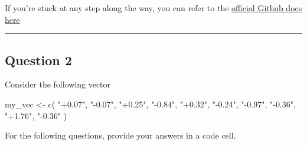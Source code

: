 \documentclass[
  letterpaper,
  DIV=11,
  numbers=noendperiod]{scrartcl}
\newenvironment{Shaded}{\begin{snugshade}}{\end{snugshade}}
\newcommand{\FunctionTok}[1]{\textcolor[rgb]{0.28,0.35,0.67}{#1}}
\newcommand{\NormalTok}[1]{\textcolor[rgb]{0.00,0.23,0.31}{#1}}
\newcommand{\OtherTok}[1]{\textcolor[rgb]{0.00,0.23,0.31}{#1}}
\newcommand{\StringTok}[1]{\textcolor[rgb]{0.13,0.47,0.30}{#1}}
\begin{document}
If you're stuck at any step along the way, you can refer to the
\href{https://docs.github.com/en/pull-requests/collaborating-with-pull-requests/proposing-changes-to-your-work-with-pull-requests/creating-a-pull-request-from-a-fork}{official
Github docs here}

\begin{center}\rule{0.5\linewidth}{0.5pt}\end{center}

\hypertarget{question-2}{%
\subsection{Question 2}\label{question-2}}

\begin{tcolorbox}[enhanced jigsaw, leftrule=.75mm, breakable, colframe=quarto-callout-tip-color-frame, coltitle=black, colback=white, opacitybacktitle=0.6, colbacktitle=quarto-callout-tip-color!10!white, left=2mm, titlerule=0mm, bottomtitle=1mm, bottomrule=.15mm, title=\textcolor{quarto-callout-tip-color}{\faLightbulb}\hspace{0.5em}{30 points}, arc=.35mm, rightrule=.15mm, toptitle=1mm, toprule=.15mm, opacityback=0]

\end{tcolorbox}

Consider the following vector

\begin{Shaded}
\begin{Highlighting}[]
\NormalTok{my\_vec }\OtherTok{\textless{}{-}} \FunctionTok{c}\NormalTok{(}
    \StringTok{"+0.07"}\NormalTok{,}
    \StringTok{"{-}0.07"}\NormalTok{,}
    \StringTok{"+0.25"}\NormalTok{,}
    \StringTok{"{-}0.84"}\NormalTok{,}
    \StringTok{"+0.32"}\NormalTok{,}
    \StringTok{"{-}0.24"}\NormalTok{,}
    \StringTok{"{-}0.97"}\NormalTok{,}
    \StringTok{"{-}0.36"}\NormalTok{,}
    \StringTok{"+1.76"}\NormalTok{,}
    \StringTok{"{-}0.36"}
\NormalTok{)}
\end{Highlighting}
\end{Shaded}

For the following questions, provide your answers in a code cell.
\end{document}
